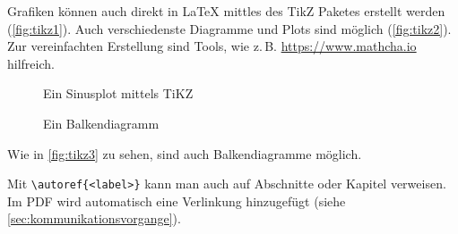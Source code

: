 Grafiken können auch direkt in \LaTeX{} mittles des TikZ Paketes erstellt werden (\autoref{fig:tikz1}). Auch verschiedenste Diagramme und Plots sind möglich (\autoref{fig:tikz2}). Zur vereinfachten Erstellung sind Tools, wie z.\,B. \href{https://www.mathcha.io}{https://www.mathcha.io} hilfreich.

\begin{figure}[ht]
	
	\caption{Ein Sinusplot mittels TiKZ}
	\label{fig:tikz2}
\end{figure}

\begin{figure}[ht]
	\caption{Ein Balkendiagramm}
	\label{fig:tikz3}
\end{figure}

Wie in \autoref{fig:tikz3} zu sehen, sind auch Balkendiagramme möglich.

Mit \verb|\autoref{<label>}| kann man auch auf Abschnitte oder Kapitel verweisen. Im PDF wird automatisch eine Verlinkung hinzugefügt (siehe \autoref{sec:kommunikationsvorgange}).


